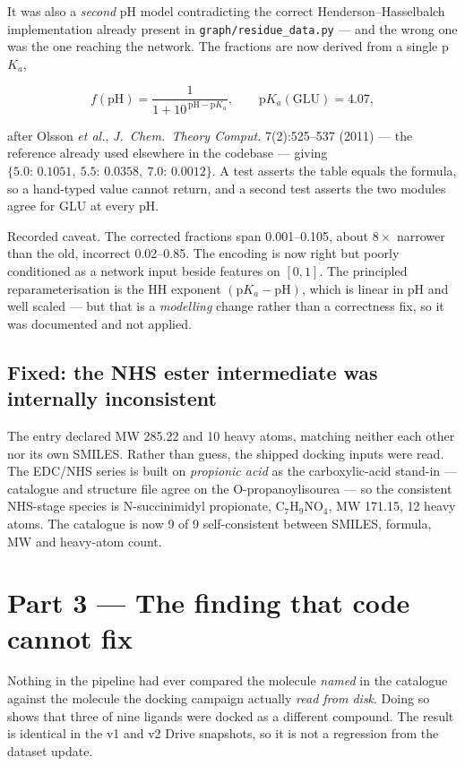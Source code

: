 \documentclass[11pt,a4paper]{article}
\newcommand{\ok}[1]{\textcolor{okgreen}{#1}}
\newcommand{\warn}[1]{\textcolor{warnorange}{#1}}
\newcommand{\code}[1]{\texttt{\small #1}}
\begin{document}
It was also a \emph{second} pH model contradicting the correct
Henderson--Hasselbalch implementation already present in
\code{graph/residue\_data.py} --- and the wrong one was the one reaching the
network. The fractions are now derived from a single p$K_a$,

\[
  f(\mathrm{pH}) = \frac{1}{1 + 10^{\,\mathrm{pH} - \mathrm{p}K_a}},
  \qquad \mathrm{p}K_a(\mathrm{GLU}) = 4.07,
\]

after Olsson \emph{et al.}, \emph{J.\ Chem.\ Theory Comput.} 7(2):525--537
(2011) --- the reference already used elsewhere in the codebase --- giving
$\{5.0{:}\,0.1051,\ 5.5{:}\,0.0358,\ 7.0{:}\,0.0012\}$. A test asserts the
table equals the formula, so a hand-typed value cannot return, and a second
test asserts the two modules agree for GLU at every pH.

\warn{Recorded caveat.} The corrected fractions span 0.001--0.105, about
$8\times$ narrower than the old, incorrect 0.02--0.85. The encoding is now
right but poorly conditioned as a network input beside features on $[0,1]$.
The principled reparameterisation is the HH exponent
$(\mathrm{p}K_a - \mathrm{pH})$, which is linear in pH and well scaled --- but
that is a \emph{modelling} change rather than a correctness fix, so it was
documented and not applied.

\subsection{Fixed: the NHS ester intermediate was internally inconsistent}

The entry declared MW 285.22 and 10 heavy atoms, matching neither each other
nor its own SMILES. Rather than guess, the shipped docking inputs were read.
The EDC/NHS series is built on \emph{propionic acid} as the carboxylic-acid
stand-in --- catalogue and structure file agree on the O-propanoylisourea ---
so the consistent NHS-stage species is N-succinimidyl propionate,
$\mathrm{C_7H_9NO_4}$, MW 171.15, 12 heavy atoms. The catalogue is now
\ok{9 of 9 self-consistent} between SMILES, formula, MW and heavy-atom count.

\section{Part 3 --- The finding that code cannot fix}

Nothing in the pipeline had ever compared the molecule \emph{named} in the
catalogue against the molecule the docking campaign actually \emph{read from
disk}. Doing so shows that three of nine ligands were docked as a different
compound. The result is identical in the v1 and v2 Drive snapshots, so it is
not a regression from the dataset update.
\end{document}
